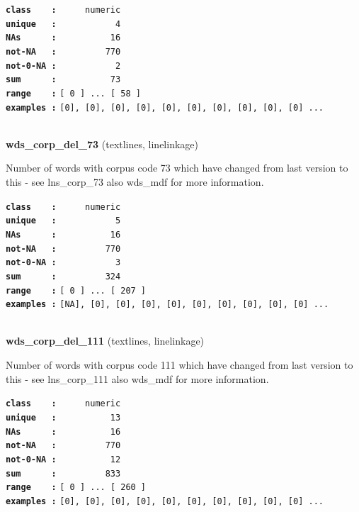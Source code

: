 \documentclass[]{article}
\begin{document}
\textbf{\texttt{class\ \ \ \ :}} \texttt{~~~~~numeric}\\
\textbf{\texttt{unique\ \ \ :}} \texttt{~~~~~~~~~~~4}\\
\textbf{\texttt{NAs\ \ \ \ \ \ :}} \texttt{~~~~~~~~~~16}\\
\textbf{\texttt{not-NA\ \ \ :}} \texttt{~~~~~~~~~770}\\
\textbf{\texttt{not-0-NA\ :}} \texttt{~~~~~~~~~~~2}\\
\textbf{\texttt{sum\ \ \ \ \ \ :}} \texttt{~~~~~~~~~~73}\\
\textbf{\texttt{range\ \ \ \ :}}
\texttt{{[}\ 0\ {]}\ ...\ {[}\ 58\ {]}}\\
\textbf{\texttt{examples\ :}}
\texttt{{[}0{]},\ {[}0{]},\ {[}0{]},\ {[}0{]},\ {[}0{]},\ {[}0{]},\ {[}0{]},\ {[}0{]},\ {[}0{]},\ {[}0{]}\ ...}\\

~

\textbf{wds\_corp\_del\_73} (textlines, linelinkage)

Number of words with corpus code 73 which have changed from last version
to this - see lns\_corp\_73 also wds\_mdf for more information.

\textbf{\texttt{class\ \ \ \ :}} \texttt{~~~~~numeric}\\
\textbf{\texttt{unique\ \ \ :}} \texttt{~~~~~~~~~~~5}\\
\textbf{\texttt{NAs\ \ \ \ \ \ :}} \texttt{~~~~~~~~~~16}\\
\textbf{\texttt{not-NA\ \ \ :}} \texttt{~~~~~~~~~770}\\
\textbf{\texttt{not-0-NA\ :}} \texttt{~~~~~~~~~~~3}\\
\textbf{\texttt{sum\ \ \ \ \ \ :}} \texttt{~~~~~~~~~324}\\
\textbf{\texttt{range\ \ \ \ :}}
\texttt{{[}\ 0\ {]}\ ...\ {[}\ 207\ {]}}\\
\textbf{\texttt{examples\ :}}
\texttt{{[}NA{]},\ {[}0{]},\ {[}0{]},\ {[}0{]},\ {[}0{]},\ {[}0{]},\ {[}0{]},\ {[}0{]},\ {[}0{]},\ {[}0{]}\ ...}\\

~

\textbf{wds\_corp\_del\_111} (textlines, linelinkage)

Number of words with corpus code 111 which have changed from last
version to this - see lns\_corp\_111 also wds\_mdf for more information.

\textbf{\texttt{class\ \ \ \ :}} \texttt{~~~~~numeric}\\
\textbf{\texttt{unique\ \ \ :}} \texttt{~~~~~~~~~~13}\\
\textbf{\texttt{NAs\ \ \ \ \ \ :}} \texttt{~~~~~~~~~~16}\\
\textbf{\texttt{not-NA\ \ \ :}} \texttt{~~~~~~~~~770}\\
\textbf{\texttt{not-0-NA\ :}} \texttt{~~~~~~~~~~12}\\
\textbf{\texttt{sum\ \ \ \ \ \ :}} \texttt{~~~~~~~~~833}\\
\textbf{\texttt{range\ \ \ \ :}}
\texttt{{[}\ 0\ {]}\ ...\ {[}\ 260\ {]}}\\
\textbf{\texttt{examples\ :}}
\texttt{{[}0{]},\ {[}0{]},\ {[}0{]},\ {[}0{]},\ {[}0{]},\ {[}0{]},\ {[}0{]},\ {[}0{]},\ {[}0{]},\ {[}0{]}\ ...}\\
\end{document}
